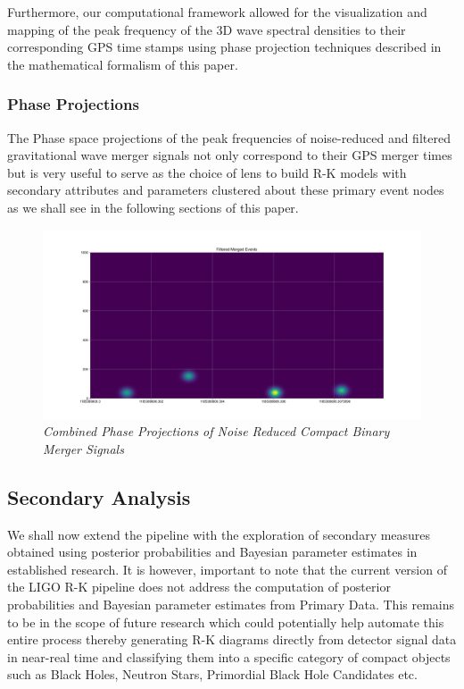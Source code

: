     Furthermore, our computational framework allowed for the visualization and mapping of the peak frequency of the 3D wave spectral densities to their corresponding GPS time stamps using phase projection techniques described in the mathematical formalism of this paper.

    \subsubsection{Phase Projections}

    The Phase space projections of the peak frequencies of noise-reduced and filtered gravitational wave merger signals not only correspond to their GPS merger times but is very useful to serve as the choice of lens to build R-K models with  secondary attributes and parameters clustered about these primary event nodes as we shall see in the following sections of this paper.
    \begin{figure}[H]
        \centering
        \includegraphics[width=1.0\linewidth]{images/50_07_Phase Projections of Noise Reduced Topological Merger Signals.png}
        \caption{\textit{Combined Phase Projections of Noise Reduced Compact Binary Merger Signals}}
        \label{fig:LIGO5_PlaceHolder_fig}
    \end{figure}

    \subsection{Secondary Analysis}

    We shall now extend the pipeline with the  exploration of secondary measures obtained using posterior probabilities and Bayesian parameter estimates in established research. \cite{24.0_BinaryMergerIdentification} \cite{24.4_CompactBinaryParameterEstimates} \cite{24.5_GWParameterEsitmation} \cite{24.6_LIGOParameterEstimates} It is however, important to note that the current version of the LIGO R-K pipeline does not address the computation of posterior probabilities and Bayesian parameter estimates from Primary Data. This remains to be in the scope of future research which could potentially help automate this entire process thereby generating R-K diagrams directly from detector signal data in near-real time and classifying them into a specific category of compact objects such as Black Holes, Neutron Stars, Primordial Black Hole Candidates etc.

